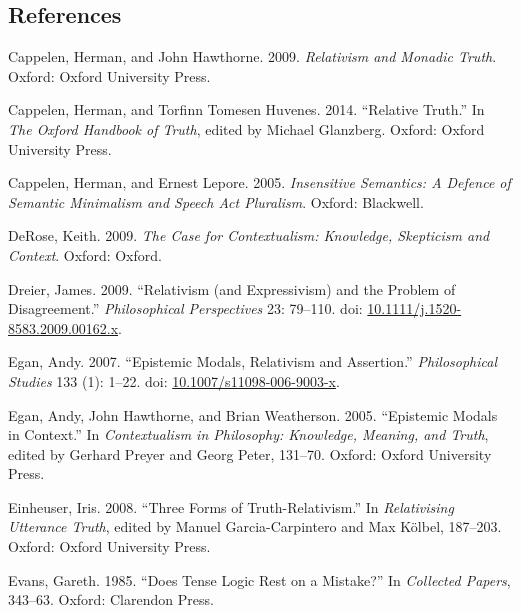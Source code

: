 \documentclass[
  10pt,
  letterpaper,
  DIV=11,
  numbers=noendperiod,
  twoside]{scrartcl}
\newlength{\cslhangindent}
\newenvironment{CSLReferences}[2] %
 {\begin{list}{}{%
  \setlength{\itemindent}{0pt}
  \setlength{\leftmargin}{0pt}
  \setlength{\parsep}{0pt}
  \ifodd #1
   \setlength{\leftmargin}{\cslhangindent}
   \setlength{\itemindent}{-1\cslhangindent}
  \fi
  \setlength{\itemsep}{#2\baselineskip}}}
 {\end{list}}
\begin{document}
\subsection*{References}\label{references}

\label{refs}
\begin{CSLReferences}{1}{0}
Cappelen, Herman, and John Hawthorne. 2009. \emph{Relativism and Monadic
Truth}. Oxford: Oxford University Press.

Cappelen, Herman, and Torfinn Tomesen Huvenes. 2014. {``Relative
Truth.''} In \emph{The Oxford Handbook of Truth}, edited by Michael
Glanzberg. Oxford: Oxford University Press.

Cappelen, Herman, and Ernest Lepore. 2005. \emph{Insensitive Semantics:
A Defence of Semantic Minimalism and Speech Act Pluralism}. Oxford:
Blackwell.

DeRose, Keith. 2009. \emph{The Case for Contextualism: Knowledge,
Skepticism and Context}. Oxford: Oxford.

Dreier, James. 2009. {``Relativism (and Expressivism) and the Problem of
Disagreement.''} \emph{Philosophical Perspectives} 23: 79--110. doi:
\href{https://doi.org/10.1111/j.1520-8583.2009.00162.x}{10.1111/j.1520-8583.2009.00162.x}.

Egan, Andy. 2007. {``{Epistemic Modals, Relativism and Assertion}.''}
\emph{Philosophical Studies} 133 (1): 1--22. doi:
\href{https://doi.org/10.1007/s11098-006-9003-x}{10.1007/s11098-006-9003-x}.

Egan, Andy, John Hawthorne, and Brian Weatherson. 2005. {``{Epistemic
Modals in Context}.''} In \emph{Contextualism in Philosophy: Knowledge,
Meaning, and Truth}, edited by Gerhard Preyer and Georg Peter, 131--70.
Oxford: Oxford University Press.

Einheuser, Iris. 2008. {``Three Forms of Truth-Relativism.''} In
\emph{Relativising Utterance Truth}, edited by Manuel Garcia-Carpintero
and Max Kölbel, 187--203. Oxford: Oxford University Press.

Evans, Gareth. 1985. {``Does Tense Logic Rest on a Mistake?''} In
\emph{Collected Papers}, 343--63. Oxford: Clarendon Press.


\end{CSLReferences}
\end{document}
